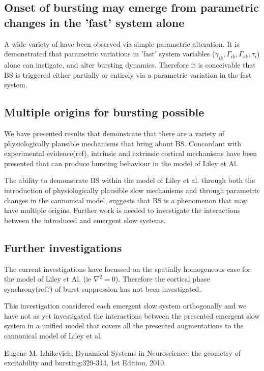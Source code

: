 \documentclass[a4paper,12pt]{article}
\begin{document}
\subsection{Onset of bursting may emerge from parametric changes in the 'fast' system alone}
A wide variety of have been observed via simple parametric alteration. It is demonstrated that parametric variations in
'fast' system variables ($\gamma_{ik}, \Gamma_{ik}, \Gamma_{ek}, \tau_i$) alone can instigate, and alter bursting
dynamics. Therefore it is conceivable that BS is triggered either partially or entirely via a parametric variation in the fast system.

\subsection{Multiple origins for bursting possible}
We have presented results that demonstrate that there are a variety of physiologically plausible mechanisms that bring about
BS. Concordant with experimental evidence(ref), intrinsic and extrinsic cortical mechanisms have been
presented that can produce bursting behaviour in the model of Liley et Al.

The ability to demonstrate BS within the model of Liley et al. through both the introduction of physiologically
plausible slow mechanisms and through parametric changes in the cannonical model, suggests that BS is a phenomenon that may have multiple origins. Further work is needed to investigate the interactions
between the introduced and emergent slow systems.

\subsection{Further investigations}
The current investigations have focussed on the spatially homogeneous case for the model of Liley et Al. (ie $\nabla^2 =
0$). Therefore the cortical phase synchrony(ref?) of burst suppression has not been investigated.

This investigation considered each emergent slow system orthogonally and we have not as yet investigated the
interactions between the presented emergent slow system in a unified model that covers all the presented augmentations to the cannonical model of Liley et al.


\begin{thebibliography}{999}

  Eugene M. Izhikevich,
  Dynamical Systems in Neuroscience: the geometry of excitability and bursting:329-344,
  1st Edition,
  2010.

\end{thebibliography}
\end{document}
